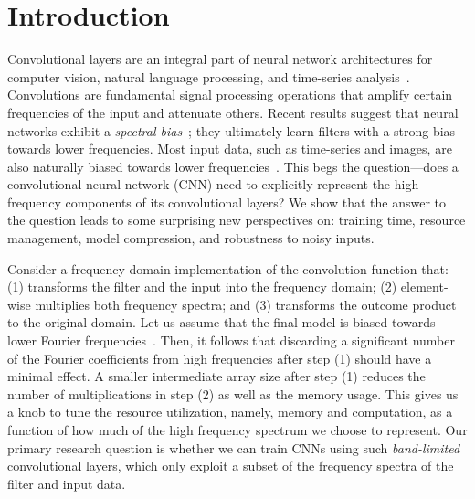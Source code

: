 \section{Introduction}
Convolutional layers are an integral part of neural network architectures for computer vision, natural language processing, and time-series analysis~\cite{KrizhevskyImageNet2012, KamperLivescu2016, binkowskiLong}.
Convolutions are fundamental signal processing operations that amplify certain frequencies of the input and attenuate others.
Recent results suggest that neural networks exhibit a {\em spectral bias}~\cite{rahaman2018spectral,xu2018training}; they ultimately learn filters with a strong bias towards lower frequencies. 
Most input data, such as time-series and images, are also naturally biased towards lower frequencies~\cite{agrawal1993efficient,Faloutsos94,imageStatistics2003}. 
This begs the question---does a convolutional neural network (CNN) need to explicitly represent the high-frequency components of its convolutional layers?
We show that the answer to the question leads to some surprising new perspectives on: training time, resource management, model compression, and robustness to noisy inputs. 

Consider a frequency domain implementation of the convolution function 
that: (1) transforms the filter and the input into the frequency domain; (2) element-wise multiplies both frequency spectra; and (3) transforms the outcome product to the original domain. Let us assume that the final model is biased towards lower Fourier frequencies~\cite{rahaman2018spectral,xu2018training}. Then, it follows that discarding a significant number of the Fourier coefficients from high frequencies after step (1) should have a minimal effect. A smaller intermediate array size after step (1) reduces the number of multiplications in step (2) as well as the memory usage.
This gives us a knob to tune the resource utilization, namely, memory and computation, as a function of how much of the high frequency spectrum we choose to represent.
Our primary research question is whether we can train CNNs using such {\em band-limited} convolutional layers, which only exploit a subset of the frequency spectra of the filter and input data.


